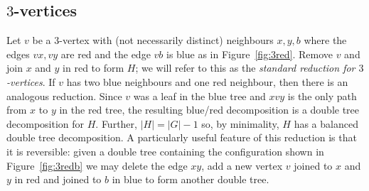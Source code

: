 \documentclass[11pt, reqno, a4paper]{article}
\theoremstyle{definition}
\numberwithin{equation}{section}
\begin{document}
\subsection{\texorpdfstring{$3$}{3}-vertices}\label{sec:3verts}

Let $v$ be a $3$-vertex with (not necessarily distinct) neighbours $x,y,b$ where the edges \(vx, vy\) are red and the edge \(vb\) is blue as in Figure~\ref{fig:3red}.
Remove $v$ and join $x$ and $y$ in red to form $H$;
we will refer to this as the \emph{standard reduction for $3$-vertices}. If \(v\) has two blue neighbours and one red neighbour, then there is an analogous reduction.
Since $v$ was a leaf in the blue tree and $xvy$ is the only path from $x$ to $y$ in the red tree, the resulting blue/red decomposition is a double tree decomposition for $H$.
Further, $|H| = |G|-1$ so, by minimality, $H$ has a balanced double tree decomposition. A particularly useful feature of this reduction is that it is reversible: given a double tree containing the configuration shown in Figure~\ref{fig:3redb} we may delete the edge $xy$, add a new vertex $v$ joined to $x$ and $y$ in red and joined to $b$ in blue to form another double tree.
\end{document}
